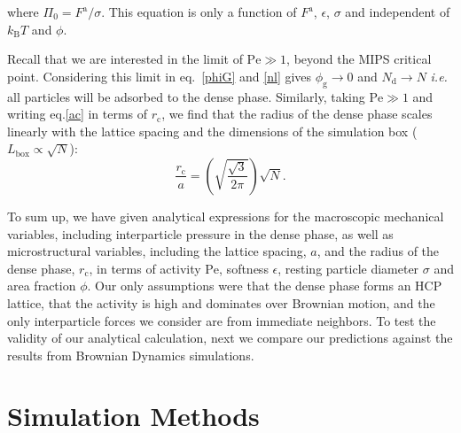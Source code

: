 \documentclass[twoside,twocolumn,9pt]{article}
\begin{document}
\noindent where $\Pi_0=F^\text{a}/\sigma$. This equation is only a function of $F^\text{a}$, $\epsilon$, $\sigma$ and independent of $k_\text{B} T$ and $\phi$.

Recall that we are interested in the limit of $\mathrm{Pe} \gg 1$, beyond the MIPS critical point. Considering this  
limit in eq.~\ref{phiG} and \ref{nl} gives $\phi_\text{g}\to 0$ and $N_\text{d}\to N$ \textit{i.e.} all particles will be adsorbed to the dense phase. Similarly, taking $\mathrm{Pe}\gg 1$ and writing eq.\ref{ac} in terms of $r_\text{c}$, we find 
that the radius of the dense phase scales linearly with the lattice spacing and the dimensions of the simulation box ($L_\text{box}\propto \sqrt{N}$):
\begin{equation}\label{newRad}
    \frac{r_\text{c}}{a}=\left(\sqrt{\frac{\sqrt{3}}{2\pi}}\right)\sqrt{N}.
\end{equation}

To sum up, we have given analytical expressions for 
the macroscopic mechanical variables, including interparticle pressure in the dense phase, as well as  microstructural variables, including the lattice spacing, $a$, and the radius of the dense phase, $r_\text{c}$, in terms of activity $\mathrm{Pe}$, softness $\epsilon$, resting particle diameter $\sigma$ and area fraction $\phi$. Our only assumptions were that the dense phase forms an HCP lattice, that the activity is high and dominates over Brownian motion, and the only interparticle forces we consider are from immediate neighbors. To test the validity of our analytical calculation, next we compare our predictions against the results from Brownian Dynamics simulations. 

\section{Simulation Methods} \label{simulation}
\end{document}
